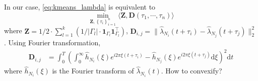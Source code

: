 		In our case, \eqref{eq:kmeans_lambda} is equivalent to 
			\begin{equation}\label{eq:unconvexified k-means}
			\min_{\mathbf{Z},\left\{ \tau_i \right\}_{i=1}^n}\langle \mathbf{Z}, \mathbf D(\tau_1,\cdots,\tau_n)  \rangle
			\end{equation}
		where $\mathbf{Z}=1/2\cdot \sum_{l=1}^k(1/|\Gamma_l|\cdot \mathbf{1}_{\Gamma_l}\mathbf{1}_{\Gamma_l}^\top)$, $\mathbf{D}_{i,j} = \| \hat\lambda_{N_i}(t+\tau_i)-\hat\lambda_{N_j}(t+\tau_j) \|_2^2$.
		Using Fourier transformation, 
		\begin{align*}
		\mathbf{D}_{i,j} &= \int_{0}^T \left( \int_0^\infty \hat h_{N_i}(\xi)e^{i2\pi\xi(t+\tau_i)}-\hat h_{N_j}(\xi)e^{i2\pi\xi(t+\tau_j)}\text{d}\xi \right)^2 \text{d}t
		\end{align*}
		where $\hat h_{N_i}(\xi)$ is the Fourier transform of $\hat\lambda_{N_i}(t)$. 
		{\color{red} How to convexify?}
		
		
		






